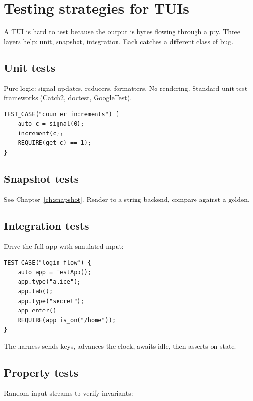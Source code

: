 \chapter{Testing strategies for TUIs}
\label{ch:testing2}

\begin{aside}
A TUI is hard to test because the output is bytes flowing
through a pty. Three layers help: unit, snapshot, integration.
Each catches a different class of bug.
\end{aside}

\section{Unit tests}

Pure logic: signal updates, reducers, formatters. No
rendering. Standard \cpp{} unit-test frameworks (Catch2,
doctest, GoogleTest).

\begin{lstlisting}
TEST_CASE("counter increments") {
    auto c = signal(0);
    increment(c);
    REQUIRE(get(c) == 1);
}
\end{lstlisting}

\section{Snapshot tests}

See Chapter~\ref{ch:snapshot}. Render to a string backend,
compare against a golden.

\section{Integration tests}

Drive the full app with simulated input:

\begin{lstlisting}
TEST_CASE("login flow") {
    auto app = TestApp();
    app.type("alice");
    app.tab();
    app.type("secret");
    app.enter();
    REQUIRE(app.is_on("/home"));
}
\end{lstlisting}

The harness sends keys, advances the clock, awaits idle,
then asserts on state.

\section{Property tests}

Random input streams to verify invariants:

